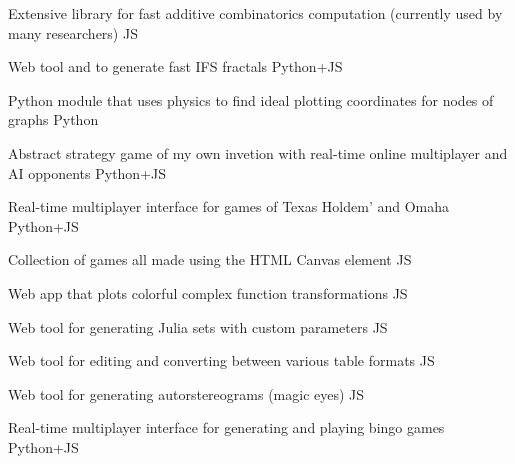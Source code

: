

\begin{cvprojects}
  
  \cvproject
  {}
  {Extensive library for fast additive combinatorics computation (currently used by many researchers)}
  {JS}

  \cvproject
  {}
  {Web tool and  to generate fast IFS fractals}
  {Python+JS}

  \cvproject
  {}
  {Python module that uses physics to find ideal plotting coordinates for nodes of graphs}
  {Python}

  \cvproject
  {}
  {Abstract strategy game of my own invetion with real-time online multiplayer and AI opponents}
  {Python+JS}

  \cvproject
  {}
  {Real-time multiplayer interface for games of Texas Holdem' and Omaha}
  {Python+JS}

  \cvproject
  {}
  {Collection of games all made using the HTML Canvas element}
  {JS}

  \cvproject
  {}
  {Web app that plots colorful complex function transformations}
  {JS}

  \cvproject
  {}
  {Web tool for generating Julia sets with custom parameters}
  {JS}
  
  \cvproject
  {}
  {Web tool for editing and converting between various table formats}
  {JS}

  \cvproject
  {}
  {Web tool for generating autorstereograms (magic eyes)}
  {JS}

  \cvproject
  {}
  {Real-time multiplayer interface for generating and playing bingo games}
  {Python+JS}




\end{cvprojects}














